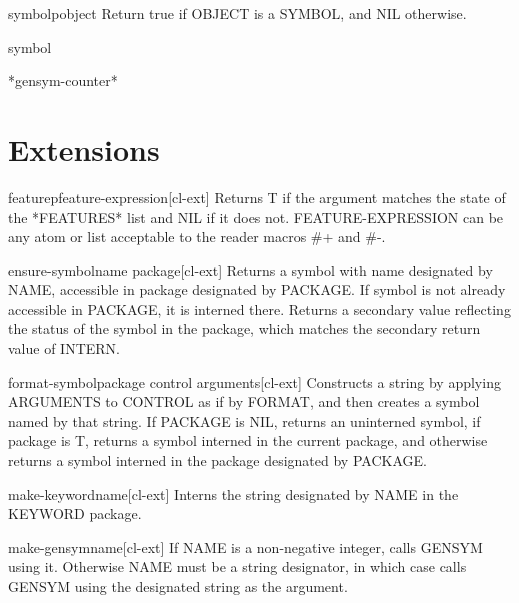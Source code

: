 \documentclass[10pt,english]{book}
\begin{document}
\begin{function}{symbolp}{object}
  Return true if OBJECT is a SYMBOL, and NIL otherwise.
\end{function}

\begin{class}{symbol}{}
  
\end{class}

\begin{variable}{*gensym-counter*}{}
  
\end{variable}

\section{Extensions}
\label{sec:extensions}

\begin{function}{featurep}{feature-expression}[cl-ext]
  Returns T if the argument matches the state of the *FEATURES*
list and NIL if it does not. FEATURE-EXPRESSION can be any atom
or list acceptable to the reader macros \#+ and \#-.
\end{function}

\begin{function}{ensure-symbol}{name \op package}[cl-ext]
  Returns a symbol with name designated by NAME, accessible in package
designated by PACKAGE. If symbol is not already accessible in PACKAGE, it is
interned there. Returns a secondary value reflecting the status of the symbol
in the package, which matches the secondary return value of INTERN.
\end{function}

\begin{function}{format-symbol}{package control \rest arguments}[cl-ext]
  Constructs a string by applying ARGUMENTS to CONTROL as if by FORMAT, and
then creates a symbol named by that string. If PACKAGE is NIL, returns an
uninterned symbol, if package is T, returns a symbol interned in the current
package, and otherwise returns a symbol interned in the package designated by
PACKAGE.
\end{function}

\begin{function}{make-keyword}{name}[cl-ext]
  Interns the string designated by NAME in the KEYWORD package.
\end{function}

\begin{function}{make-gensym}{name}[cl-ext]
  If NAME is a non-negative integer, calls GENSYM using it. Otherwise NAME
must be a string designator, in which case calls GENSYM using the designated
string as the argument.
\end{function}
\end{document}
